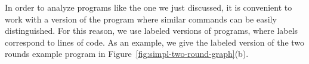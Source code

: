 
 In order to analyze programs like the one we just discussed, it is convenient to work with a version of the program where similar commands can be easily distinguished. For this reason, we use labeled versions of programs, where labels correspond to lines of code. As an example, we give the labeled version of the two rounds example program in Figure~\ref{fig:simpl-two-round-graph}(b).


